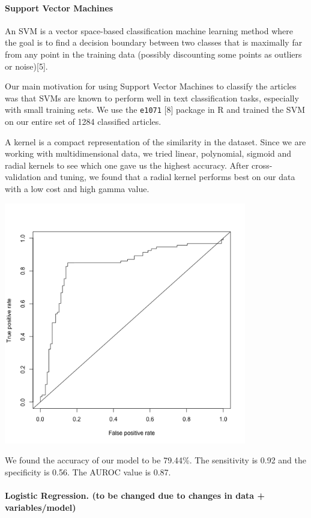 \documentclass[10pt,letterpaper]{article}
\begin{document}
\paragraph{Support Vector Machines}\label{support-vector-machines}

An SVM is a vector space-based classification machine learning method
where the goal is to find a decision boundary between two classes that
is maximally far from any point in the training data (possibly
discounting some points as outliers or noise){[}5{]}.

Our main motivation for using Support Vector Machines to classify the
articles was that SVMs are known to perform well in text classification
tasks, especially with small training sets. We use the \texttt{e1071}
{[}8{]} package in R and trained the SVM on our entire set of 1284
classified articles.

A kernel is a compact representation of the similarity in the dataset.
Since we are working with multidimensional data, we tried linear,
polynomial, sigmoid and radial kernels to see which one gave us the
highest accuracy. After cross-validation and tuning, we found that a
radial kernel performs best on our data with a low cost and high gamma
value.

\includegraphics[width=400px]{roc-curve}

We found the accuracy of our model to be 79.44\%. The sensitivity is
0.92 and the specificity is 0.56. The AUROC value is 0.87.

\paragraph{Logistic Regression. (to be changed due to changes in data +
variables/model)}\label{logistic-regression.-to-be-changed-due-to-changes-in-data-variablesmodel}
\end{document}
